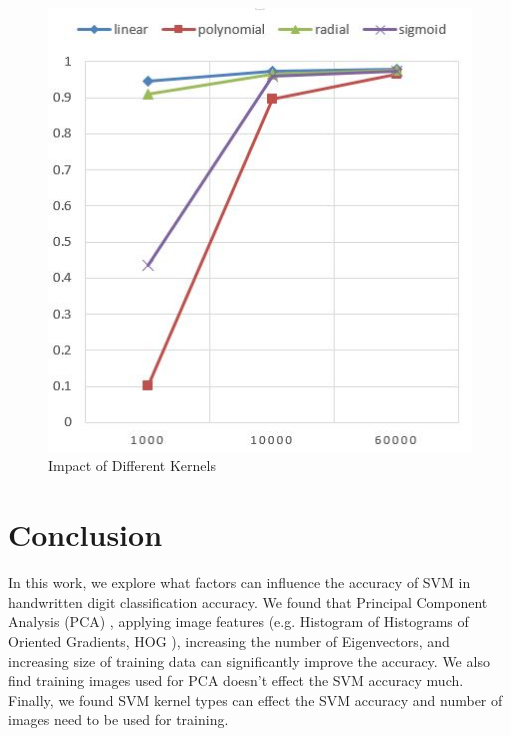 \documentclass[10pt,twocolumn,letterpaper]{article}
\begin{document}
\begin{figure}
  \includegraphics[width=0.95\linewidth]{f3.JPG}
  \caption{Impact of Different Kernels}
  \label{f3}
\end{figure}

\section{Conclusion}
In this work, we explore what factors can influence the accuracy of SVM in handwritten digit classification accuracy. We found that Principal Component Analysis (PCA) \cite{jolliffe2002principal}, applying image features (e.g. Histogram of Histograms of Oriented Gradients, HOG \cite{dalal2005histograms}), increasing the number of Eigenvectors, and increasing size of training data can significantly improve the accuracy. We also find training images used for PCA doesn't effect the SVM accuracy much. Finally, we found SVM kernel types can effect the SVM accuracy and number of images need to be used for training.


{\small


}
\end{document}
